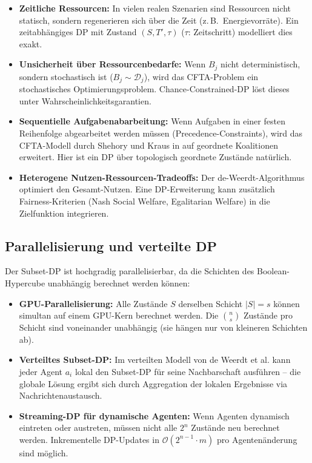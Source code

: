 \documentclass[a4paper,12pt]{article}
\theoremstyle{definition}
\begin{document}
\begin{itemize}
    \item \textbf{Zeitliche Ressourcen:} In vielen realen Szenarien sind
          Ressourcen nicht statisch, sondern regenerieren sich \"{u}ber die Zeit
          (z.\,B.\ Energievorr\"{a}te). Ein zeitabh\"{a}ngiges DP mit Zustand
          $(S, T', \tau)$ ($\tau$: Zeitschritt) modelliert dies exakt.
    \item \textbf{Unsicherheit \"{u}ber Ressourcenbedarfe:} Wenn $B_j$ nicht
          deterministisch, sondern stochastisch ist ($B_j \sim \mathcal{D}_j$),
          wird das CFTA-Problem ein stochastisches Optimierungsproblem.
          Chance-Constrained-DP \cite{prekopa1995} l\"{o}st dieses unter
          Wahrscheinlichkeitsgarantien.
    \item \textbf{Sequentielle Aufgabenabarbeitung:} Wenn Aufgaben in einer
          festen Reihenfolge abgearbeitet werden m\"{u}ssen (Precedence-Constraints),
          wird das CFTA-Modell durch Shehory und Kraus in \cite{sk96} auf
          geordnete Koalitionen erweitert. Hier ist ein DP \"{u}ber topologisch
          geordnete Zust\"{a}nde nat\"{u}rlich.
    \item \textbf{Heterogene Nutzen-Ressourcen-Tradeoffs:} Der de-Weerdt-Algorithmus
          optimiert den Gesamt-Nutzen. Eine DP-Erweiterung kann zus\"{a}tzlich
          Fairness-Kriterien (Nash Social Welfare, Egalitarian Welfare) in die
          Zielfunktion integrieren.
\end{itemize}

\subsection{Parallelisierung und verteilte DP}

Der Subset-DP ist hochgradig parallelisierbar, da die Schichten des
Boolean-Hypercube unabh\"{a}ngig berechnet werden k\"{o}nnen:

\begin{itemize}
    \item \textbf{GPU-Parallelisierung:} Alle Zust\"{a}nde $S$ derselben
          Schicht $|S| = s$ k\"{o}nnen simultan auf einem GPU-Kern berechnet
          werden. Die $\binom{n}{s}$ Zust\"{a}nde pro Schicht sind voneinander
          unabh\"{a}ngig (sie h\"{a}ngen nur von kleineren Schichten ab).
    \item \textbf{Verteiltes Subset-DP:} Im verteilten Modell von de Weerdt
          et al. kann jeder Agent $a_i$ lokal den Subset-DP f\"{u}r seine
          Nachbarschaft ausf\"{u}hren -- die globale L\"{o}sung ergibt sich durch
          Aggregation der lokalen Ergebnisse via Nachrichtenaustausch.
    \item \textbf{Streaming-DP f\"{u}r dynamische Agenten:} Wenn Agenten
          dynamisch eintreten oder austreten, m\"{u}ssen nicht alle $2^n$
          Zust\"{a}nde neu berechnet werden. Inkrementelle DP-Updates in
          $\mathcal{O}(2^{n-1} \cdot m)$ pro Agenten\"{a}nderung sind m\"{o}glich.
\end{itemize}
\end{document}
